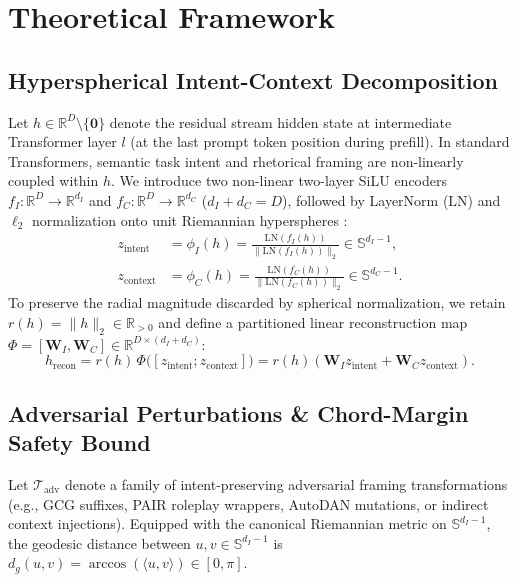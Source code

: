 \documentclass[11pt,twocolumn,a4paper]{article}
\begin{document}
\section{Theoretical Framework}
\label{sec:formulation}

\subsection{Hyperspherical Intent-Context Decomposition}
Let $h \in \mathbb{R}^D \setminus \{\mathbf{0}\}$ denote the residual stream hidden state at intermediate Transformer layer $l$ (at the last prompt token position during prefill). In standard Transformers, semantic task intent and rhetorical framing are non-linearly coupled within $h$. We introduce two non-linear two-layer SiLU encoders $f_I: \mathbb{R}^D \to \mathbb{R}^{d_I}$ and $f_C: \mathbb{R}^D \to \mathbb{R}^{d_C}$ ($d_I + d_C = D$), followed by LayerNorm ($\text{LN}$) and $\ell_2$ normalization onto unit Riemannian hyperspheres \citep{absil2008optimization,bronstein2021geometric}:
\begin{align}
    z_{\text{intent}} &= \phi_I(h) = \frac{\text{LN}(f_I(h))}{\|\text{LN}(f_I(h))\|_2} \in \mathbb{S}^{d_I-1}, \label{eq:phi_I} \\
    z_{\text{context}} &= \phi_C(h) = \frac{\text{LN}(f_C(h))}{\|\text{LN}(f_C(h))\|_2} \in \mathbb{S}^{d_C-1}. \label{eq:phi_C}
\end{align}
To preserve the radial magnitude discarded by spherical normalization, we retain $r(h) = \|h\|_2 \in \mathbb{R}_{>0}$ and define a partitioned linear reconstruction map $\Phi = [\mathbf{W}_I, \mathbf{W}_C] \in \mathbb{R}^{D \times (d_I + d_C)}$:
\begin{equation}
    h_{\text{recon}} = r(h)\,\Phi\big([z_{\text{intent}}; z_{\text{context}}]\big) = r(h)\left(\mathbf{W}_I z_{\text{intent}} + \mathbf{W}_C z_{\text{context}}\right).
    \label{eq:recon}
\end{equation}

\subsection{Adversarial Perturbations \& Chord-Margin Safety Bound}
Let $\mathcal{T}_{\text{adv}}$ denote a family of intent-preserving adversarial framing transformations (e.g., GCG suffixes, PAIR roleplay wrappers, AutoDAN mutations, or indirect context injections). Equipped with the canonical Riemannian metric on $\mathbb{S}^{d_I-1}$, the geodesic distance between $u, v \in \mathbb{S}^{d_I-1}$ is $d_g(u, v) = \arccos(\langle u, v \rangle) \in [0, \pi]$.
\end{document}

